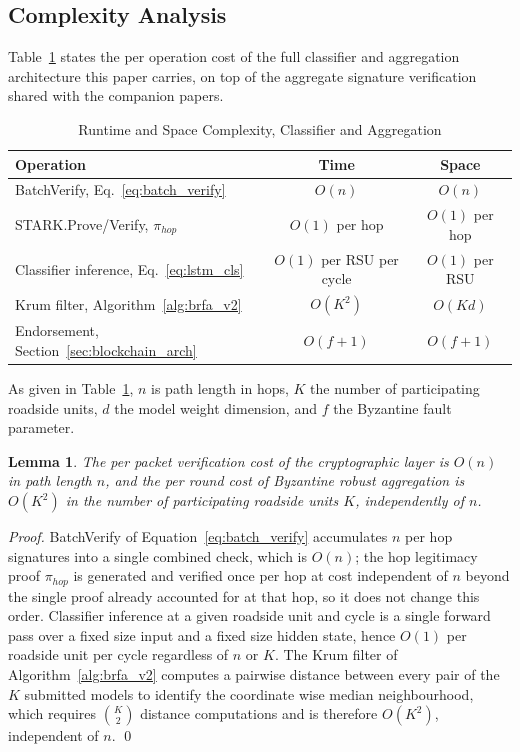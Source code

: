 \documentclass[final,5p,twocolumn]{elsarticle}
\newtheorem{lemma}{Lemma}
\theoremstyle{remark}
\theoremstyle{plain}
\begin{document}
\subsection{Complexity Analysis}
\label{app:complexity}

Table~\ref{tab:vanguard_complexity} states the per operation cost of the
full classifier and aggregation architecture this paper carries, on top of
the aggregate signature verification shared with the companion papers.
\begin{table}[!t]
	\centering
	\caption{Runtime and Space Complexity, Classifier and Aggregation}
	\label{tab:vanguard_complexity}
	\renewcommand{\arraystretch}{1.2}
	\footnotesize
	\begin{tabular}{|l|c|c|}
		\hline
		\textbf{Operation} & \textbf{Time} & \textbf{Space} \\
		\hline
		BatchVerify, Eq.~\eqref{eq:batch_verify} & $O(n)$ & $O(n)$ \\
		\hline
		STARK.Prove/Verify, $\pi_{hop}$ & $O(1)$ per hop & $O(1)$ per hop \\
		\hline
		Classifier inference, Eq.~\eqref{eq:lstm_cls} & $O(1)$ per RSU per cycle & $O(1)$ per RSU \\
		\hline
		Krum filter, Algorithm~\ref{alg:brfa_v2} & $O(K^2)$ & $O(Kd)$ \\
		\hline
		Endorsement, Section~\ref{sec:blockchain_arch} & $O(f{+}1)$ & $O(f{+}1)$ \\
		\hline
	\end{tabular}
\end{table}
As given in Table~\ref{tab:vanguard_complexity}, $n$ is path length in hops,
$K$ the number of participating roadside units, $d$ the model weight
dimension, and $f$ the Byzantine fault parameter.

\begin{lemma}
	\label{lem:vanguard_complexity}
	The per packet verification cost of the cryptographic layer is $O(n)$
	in path length $n$, and the per round cost of Byzantine robust
	aggregation is $O(K^2)$ in the number of participating roadside units
	$K$, independently of $n$.
\end{lemma}
\begin{proof}
	BatchVerify of Equation~\eqref{eq:batch_verify} accumulates $n$ per hop
	signatures into a single combined check, which is $O(n)$; the hop
	legitimacy proof $\pi_{hop}$ is generated and verified once per hop at
	cost independent of $n$ beyond the single proof already accounted for
	at that hop, so it does not change this order. Classifier inference at
	a given roadside unit and cycle is a single forward pass over a fixed
	size input and a fixed size hidden state, hence $O(1)$ per roadside
	unit per cycle regardless of $n$ or $K$. The Krum filter of
	Algorithm~\ref{alg:brfa_v2} computes a pairwise distance between every
	pair of the $K$ submitted models to identify the coordinate wise
	median neighbourhood, which requires $\binom{K}{2}$ distance
	computations and is therefore $O(K^2)$, independent of $n$.
	\qed
\end{proof}
\end{document}
